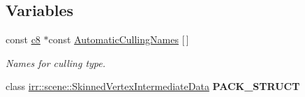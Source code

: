 \subsection*{Variables}
\begin{DoxyCompactItemize}
\item 
const \hyperlink{namespaceirr_a9395eaea339bcb546b319e9c96bf7410}{c8} $\ast$const \hyperlink{namespaceirr_1_1scene_afb3e3fc1668bd602189bab446801aa12}{Automatic\+Culling\+Names} \mbox{[}$\,$\mbox{]}
\begin{DoxyCompactList}\small\item\em Names for culling type. \end{DoxyCompactList}\item 
class \hyperlink{classirr_1_1scene_1_1SkinnedVertexIntermediateData}{irr\+::scene\+::\+Skinned\+Vertex\+Intermediate\+Data} {\bfseries P\+A\+C\+K\+\_\+\+S\+T\+R\+U\+CT}\hypertarget{namespaceirr_1_1scene_a4a677f55c26391ee76d104f11788dc0c}{}\label{namespaceirr_1_1scene_a4a677f55c26391ee76d104f11788dc0c}


\end{DoxyCompactItemize}
